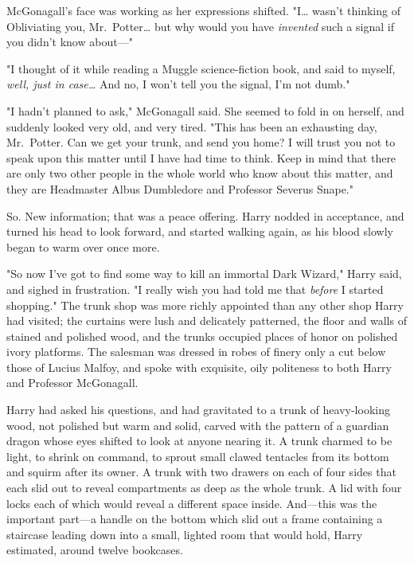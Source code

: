McGonagall's face was working as her expressions shifted. "I{\ldots} wasn't 
thinking of Obliviating you, Mr.~Potter{\ldots} but why would you have 
\emph{invented} such a signal if you didn't know about---"

"I thought of it while reading a Muggle science-fiction book, and said to 
myself, \emph{well, just in case{\ldots}} And no, I won't tell you the signal, 
I'm not dumb."

"I hadn't planned to ask," McGonagall said. She seemed to fold in on herself, 
and suddenly looked very old, and very tired. "This has been an exhausting day, 
Mr.~Potter. Can we get your trunk, and send you home? I will trust you not to 
speak upon this matter until I have had time to think. Keep in mind that there 
are only two other people in the whole world who know about this matter, and 
they are Headmaster Albus Dumbledore and Professor Severus Snape."

So. New information; that was a peace offering. Harry nodded in acceptance, and 
turned his head to look forward, and started walking again, as his blood slowly 
began to warm over once more.

"So now I've got to find some way to kill an immortal Dark Wizard," Harry said, 
and sighed in frustration. "I really wish you had told me that \emph{before} I 
started shopping."
\sbreak
The trunk shop was more richly appointed than any other shop Harry had visited; 
the curtains were lush and delicately patterned, the floor and walls of stained 
and polished wood, and the trunks occupied places of honor on polished ivory 
platforms. The salesman was dressed in robes of finery only a cut below those 
of Lucius Malfoy, and spoke with exquisite, oily politeness to both Harry and 
Professor McGonagall.

Harry had asked his questions, and had gravitated to a trunk of heavy-looking 
wood, not polished but warm and solid, carved with the pattern of a guardian 
dragon whose eyes shifted to look at anyone nearing it. A trunk charmed to be 
light, to shrink on command, to sprout small clawed tentacles from its bottom 
and squirm after its owner. A trunk with two drawers on each of four sides that 
each slid out to reveal compartments as deep as the whole trunk. A lid with 
four locks each of which would reveal a different space inside. And---this was 
the important part---a handle on the bottom which slid out a frame containing a 
staircase leading down into a small, lighted room that would hold, Harry 
estimated, around twelve bookcases.

